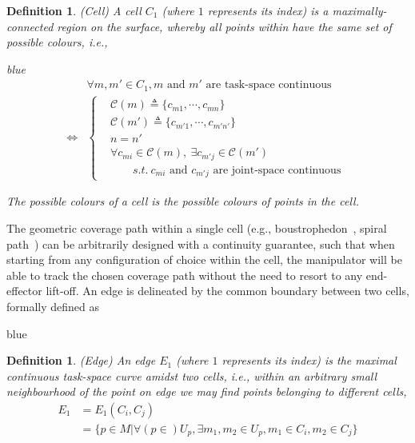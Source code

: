 \documentclass[journal]{IEEEtran}
\newtheorem{definition}[theorem]{Definition}
\begin{document}
\begin{definition}
(Cell) A cell $C_1$ (where $1$ represents its index) is a maximally-connected region on the surface, whereby all points within have the same set of possible colours, i.e., 
\begin{color}{blue}
\begin{equation}
\begin{aligned}
&\forall m, m'\in C_1, m \mbox{ and } m' \mbox{ are task-space continuous} \\
\Leftrightarrow &
\left\{\begin{aligned}
&\mathscr{C}(m) \triangleq \{c_{m1}, \cdots, c_{mn}\}\\
&\mathscr{C}(m') \triangleq \{c_{m'1}, \cdots, c_{m'n'}\}\\
& n = n'\\
& \forall c_{mi}\in \mathscr{C}(m),\ \exists c_{m'j}\in \mathscr{C}(m')\\
&\qquad s.t.\ c_{mi} \mbox{ and } c_{m'j}\mbox{ are joint-space continuous }
\end{aligned}
\right.
\end{aligned}
\end{equation}
\end{color}
The possible colours of a cell is the possible colours of points in the cell. 
\end{definition}
The geometric coverage path within a single cell (e.g., boustrophedon~\cite{choset1998coverage}, spiral path~\cite{hassan2018a}) can be arbitrarily designed with a continuity guarantee, such that when starting from any configuration of choice within the cell, the manipulator will be able to track the chosen coverage path without the need to resort to any end-effector lift-off. 
An edge is delineated by the common boundary between two cells, formally defined as 
\begin{color}{blue}
\begin{definition}
(Edge) An edge $E_1$ (where $1$ represents its index) is the maximal continuous task-space curve amidst two cells, i.e., within an arbitrary small neighbourhood of the point on edge we may find points belonging to different cells, 
\begin{equation}
\begin{aligned}
E_1 &= E_1(C_i, C_j) \\
&= \{p\in M|\forall (p\in) U_p, \exists m_1, m_2\in U_p, m_1\in C_i, m_2\in C_j\}
\end{aligned}
\end{equation}
\end{definition}
\end{color}
\end{document}

